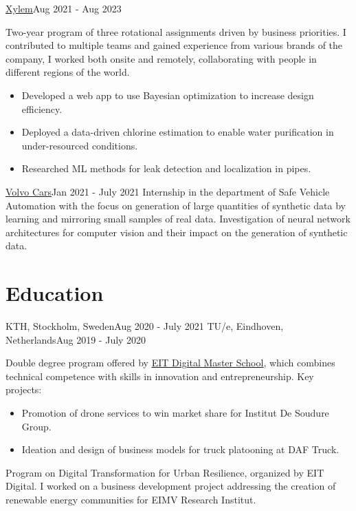 \documentclass[hipsterpaolo]{simplehipstercv}
\begin{document}
\begin{paracol}{2}
{
{\underline{\href{https://www.xylem.com/en-us/}{Xylem}}}{Aug 2021 - Aug 2023}
{
    Two-year program of three rotational assignments driven by business priorities.
    I contributed to multiple teams and gained experience from various brands of the company, I worked both onsite and remotely,
    collaborating with people in different regions of the world.
    \begin{itemize}[leftmargin=*]
        \item Developed a web app to use Bayesian optimization to increase design efficiency.
        \item Deployed a data-driven chlorine estimation to enable water purification in under-resourced conditions.
        \item Researched ML methods for leak detection and localization in pipes.
    \end{itemize}
}

{\underline{\href{https://www.volvocars.com/se/}{Volvo Cars}}}{Jan 2021 - July 2021}
{Internship in the department of Safe Vehicle Automation with the focus on
generation of large quantities of synthetic data by learning and mirroring
small samples of real data. Investigation of neural network architectures for
computer vision and their impact on the generation of synthetic data.}

\section*{Education}
{KTH, Stockholm, Sweden}{Aug 2020 - July 2021}
{TU/e, Eindhoven, Netherlands}{Aug 2019 - July 2020}
{Double degree program offered by \underline{\href{https://masterschool.eitdigital.eu/}{EIT Digital Master School}}, which
combines technical competence with skills in innovation and
entrepreneurship.
Key projects:
\begin{itemize}[leftmargin=*]
    \item Promotion of drone services to win market share for Institut De Soudure Group.
    \item Ideation and design of business models for truck platooning at DAF Truck.
\end{itemize}
}

{Program on Digital Transformation for Urban Resilience, organized by EIT
Digital. I worked on a business development project addressing the
creation of renewable energy communities for EIMV Research Institut.}

}
\end{paracol}
\end{document}
